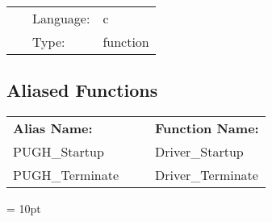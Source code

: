 \documentclass{article}
\begin{document}
\hspace{5mm}

 \begin{tabular*}{160mm}{cll} 
~ & Language:  & c \\ 
~ & Type:  & function \\ 
\end{tabular*} 


\subsection*{Aliased Functions}

\hspace{5mm}

 \begin{tabular*}{160mm}{ll} 

{\bf Alias Name:} ~~~~~~~ & {\bf Function Name:} \\ 
PUGH\_Startup & Driver\_Startup \\ 
PUGH\_Terminate & Driver\_Terminate \\ 
\end{tabular*} 



\vspace{5mm}\parskip = 10pt 
\end{document}
